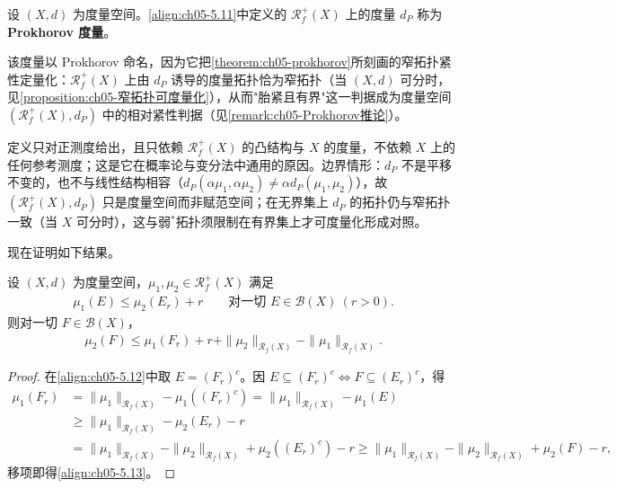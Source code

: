 \documentclass[../../main.tex]{subfiles}%
\begin{document}
\begin{definition}\label{definition:ch05-Prokhorov}
设 $(X,d)$ 为度量空间。\eqref{align:ch05-5.11}中定义的 $\mathscr{R}^+_f(X)$ 上的度量 $d_P$ 称为 \textbf{Prokhorov 度量}。
\end{definition}

\begin{remark}\label{remark:ch05-Prokhorov距离命名}
该度量以 Prokhorov 命名，因为它把\cref{theorem:ch05-prokhorov}所刻画的窄拓扑紧性定量化：$\mathscr{R}^+_f(X)$ 上由 $d_P$ 诱导的度量拓扑恰为窄拓扑（当 $(X,d)$ 可分时，见\cref{proposition:ch05-窄拓扑可度量化}），从而"胎紧且有界"这一判据成为度量空间 $(\mathscr{R}^+_f(X),d_P)$ 中的相对紧性判据（见\cref{remark:ch05-Prokhorov推论}）。

定义只对正测度给出，且只依赖 $\mathscr{R}^+_f(X)$ 的凸结构与 $X$ 的度量，不依赖 $X$ 上的任何参考测度；这是它在概率论与变分法中通用的原因。边界情形：$d_P$ 不是平移不变的，也不与线性结构相容（$d_P(\alpha\mu_1,\alpha\mu_2)\neq\alpha d_P(\mu_1,\mu_2)$），故 $(\mathscr{R}^+_f(X),d_P)$ 只是度量空间而非赋范空间；在无界集上 $d_P$ 的拓扑仍与窄拓扑一致（当 $X$ 可分时），这与弱$^*$拓扑须限制在有界集上才可度量化形成对照。
\end{remark}

现在证明如下结果。

\begin{lemma}\label{lemma:ch05-Prokhorov对称}
设 $(X,d)$ 为度量空间，$\mu_1,\mu_2\in\mathscr{R}^+_f(X)$ 满足
\begin{align}
\mu_1(E)\leqslant\mu_2(E_r)+r\qquad\text{对一切 }E\in\mathscr{B}(X)\ (r>0).\label{align:ch05-5.12}
\end{align}
则对一切 $F\in\mathscr{B}(X)$，
\begin{align}
\mu_2(F)\leqslant\mu_1(F_r)+r+\|\mu_2\|_{\mathscr{R}_f(X)}-\|\mu_1\|_{\mathscr{R}_f(X)}.\label{align:ch05-5.13}
\end{align}
\end{lemma}

\begin{proof}
在\eqref{align:ch05-5.12}中取 $E=(F_r)^c$。因 $E\subseteq(F_r)^c\Leftrightarrow F\subseteq(E_r)^c$，得
\begin{align*}
\mu_1(F_r)&=\|\mu_1\|_{\mathscr{R}_f(X)}-\mu_1((F_r)^c)
=\|\mu_1\|_{\mathscr{R}_f(X)}-\mu_1(E)\\
&\geqslant\|\mu_1\|_{\mathscr{R}_f(X)}-\mu_2(E_r)-r\\
&=\|\mu_1\|_{\mathscr{R}_f(X)}-\|\mu_2\|_{\mathscr{R}_f(X)}
+\mu_2((E_r)^c)-r
\geqslant\|\mu_1\|_{\mathscr{R}_f(X)}-\|\mu_2\|_{\mathscr{R}_f(X)}
+\mu_2(F)-r,
\end{align*}
移项即得\eqref{align:ch05-5.13}。
\end{proof}
\end{document}
